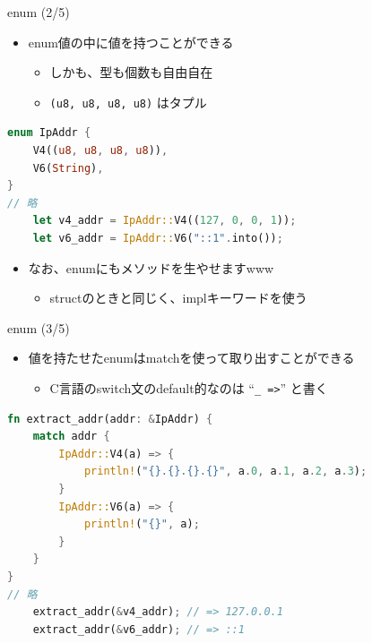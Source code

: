 \documentclass[cjk,dvipdfmx,10pt,compress,fragile%
hyperref={bookmarks=true,bookmarksnumbered=true,bookmarksopen=false,%
colorlinks=false,%
pdftitle={第 134 回 関西 Debian 勉強会},%
pdfauthor={小林},%
pdfsubject={資料},%
}]{beamer}
\begin{document}
\begin{frame}[t,fragile]{enum (2/5)}
 \begin{itemize}
  \item enum値の中に値を持つことができる
	\begin{itemize}
	 \item しかも、型も個数も自由自在
	 \item \verb|(u8, u8, u8, u8)| はタプル
	\end{itemize}
 \end{itemize}
\begin{lstlisting}[language=Rust,style=boxed,style=colouredRust,basicstyle=\small\tt,lineskip=-2pt]
enum IpAddr {
    V4((u8, u8, u8, u8)),
    V6(String),
}
// 略
    let v4_addr = IpAddr::V4((127, 0, 0, 1));
    let v6_addr = IpAddr::V6("::1".into());\end{lstlisting}
\begin{itemize}
 \item なお、enumにもメソッドを生やせますwww
       \begin{itemize}
	\item structのときと同じく、implキーワードを使う
       \end{itemize}
\end{itemize}
\end{frame}

\begin{frame}[t,fragile]{enum (3/5)}
\begin{itemize}
 \item 値を持たせたenumはmatchを使って取り出すことができる
       \begin{itemize}
	\item C言語のswitch文のdefault的なのは ``\verb|_ =>|'' と書く
       \end{itemize}
\end{itemize}
\begin{lstlisting}[language=Rust,style=boxed,style=colouredRust,basicstyle=\small\tt,lineskip=-2pt]
fn extract_addr(addr: &IpAddr) {
    match addr {
        IpAddr::V4(a) => {
            println!("{}.{}.{}.{}", a.0, a.1, a.2, a.3);
        }
        IpAddr::V6(a) => {
            println!("{}", a);
        }
    }
}
// 略
    extract_addr(&v4_addr); // => 127.0.0.1
    extract_addr(&v6_addr); // => ::1\end{lstlisting}
\end{frame}
\end{document}
